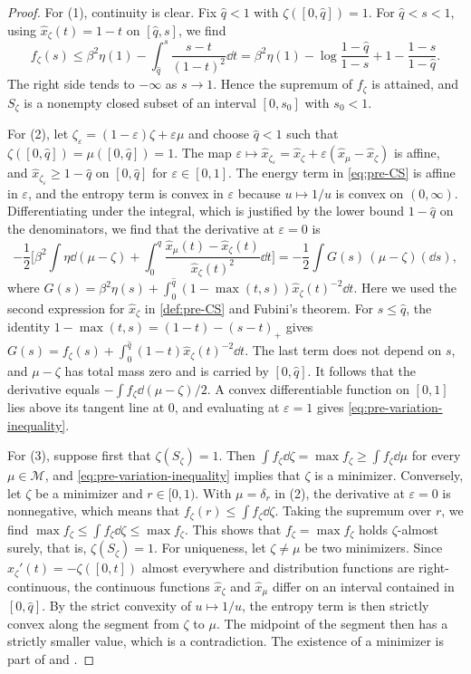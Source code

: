 \begin{proof}
For (1), continuity is clear. Fix $\hat q<1$ with $\zeta([0,\hat q])=1$. For $\hat q<s<1$, using $\hat x_\zeta(t)=1-t$ on $[\hat q,s]$, we find
\[
f_\zeta(s)\le\beta^2\eta(1)-\int_{\hat q}^s\frac{s-t}{(1-t)^2}\dd t=\beta^2\eta(1)-\log\frac{1-\hat q}{1-s}+1-\frac{1-s}{1-\hat q}.
\]
The right side tends to $-\infty$ as $s\to1$. Hence the supremum of $f_\zeta$ is attained, and $S_\zeta$ is a nonempty closed subset of an interval $[0,s_0]$ with $s_0<1$.

For (2), let $\zeta_\varepsilon=(1-\varepsilon)\zeta+\varepsilon\mu$ and choose $\hat q<1$ such that $\zeta([0,\hat q])=\mu([0,\hat q])=1$. The map $\varepsilon\mapsto\hat x_{\zeta_\varepsilon}=\hat x_\zeta+\varepsilon(\hat x_\mu-\hat x_\zeta)$ is affine, and $\hat x_{\zeta_\varepsilon}\ge1-\hat q$ on $[0,\hat q]$ for $\varepsilon\in[0,1]$. The energy term in \eqref{eq:pre-CS} is affine in $\varepsilon$, and the entropy term is convex in $\varepsilon$ because $u\mapsto1/u$ is convex on $(0,\infty)$. Differentiating under the integral, which is justified by the lower bound $1-\hat q$ on the denominators, we find that the derivative at $\varepsilon=0$ is
\[
-\frac12\bigg[\beta^2\int\eta\dd(\mu-\zeta)+\int_0^{\hat q}\frac{\hat x_\mu(t)-\hat x_\zeta(t)}{\hat x_\zeta(t)^2}\dd t\bigg]=-\frac12\int G(s)\,(\mu-\zeta)(\dd s),
\]
where $G(s)=\beta^2\eta(s)+\int_0^{\hat q}(1-\max(t,s))\hat x_\zeta(t)^{-2}\dd t$. Here we used the second expression for $\hat x_\zeta$ in \cref{def:pre-CS} and Fubini's theorem. For $s\le\hat q$, the identity $1-\max(t,s)=(1-t)-(s-t)_+$ gives $G(s)=f_\zeta(s)+\int_0^{\hat q}(1-t)\hat x_\zeta(t)^{-2}\dd t$. The last term does not depend on $s$, and $\mu-\zeta$ has total mass zero and is carried by $[0,\hat q]$. It follows that the derivative equals $-\int f_\zeta\dd(\mu-\zeta)/2$. A convex differentiable function on $[0,1]$ lies above its tangent line at $0$, and evaluating at $\varepsilon=1$ gives \eqref{eq:pre-variation-inequality}.

For (3), suppose first that $\zeta(S_\zeta)=1$. Then $\int f_\zeta\dd\zeta=\max f_\zeta\ge\int f_\zeta\dd\mu$ for every $\mu\in\mathscr M$, and \eqref{eq:pre-variation-inequality} implies that $\zeta$ is a minimizer. Conversely, let $\zeta$ be a minimizer and $r\in[0,1)$. With $\mu=\delta_r$ in (2), the derivative at $\varepsilon=0$ is nonnegative, which means that $f_\zeta(r)\le\int f_\zeta\dd\zeta$. Taking the supremum over $r$, we find $\max f_\zeta\le\int f_\zeta\dd\zeta\le\max f_\zeta$. This shows that $f_\zeta=\max f_\zeta$ holds $\zeta$-almost surely, that is, $\zeta(S_\zeta)=1$. For uniqueness, let $\zeta\ne\mu$ be two minimizers. Since $\hat x_\zeta'(t)=-\zeta([0,t])$ almost everywhere and distribution functions are right-continuous, the continuous functions $\hat x_\zeta$ and $\hat x_\mu$ differ on an interval contained in $[0,\hat q]$. By the strict convexity of $u\mapsto1/u$, the entropy term is then strictly convex along the segment from $\zeta$ to $\mu$. The midpoint of the segment then has a strictly smaller value, which is a contradiction. The existence of a minimizer is part of \cite[Proposition~2.1]{Talagrand2006} and \cite[Lemma~1.2]{HuangSellke2024}.
\end{proof}

